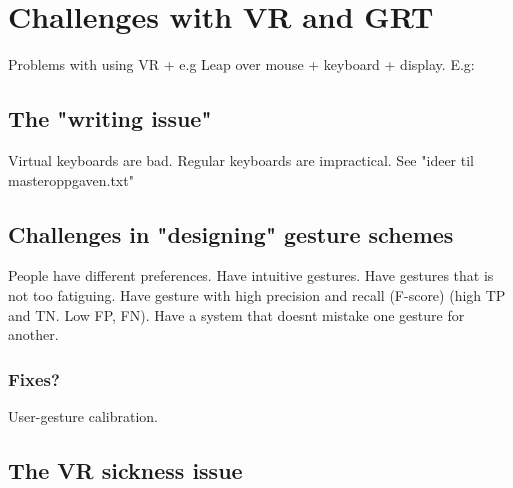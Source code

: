 \section{Challenges with VR and GRT} 
Problems with using VR + e.g Leap over mouse + keyboard + display. E.g:

\subsection{The "writing issue"}
Virtual keyboards are bad. 
Regular keyboards are impractical. 
See "ideer til masteroppgaven.txt"

\subsection{Challenges in "designing" gesture schemes}
People have different preferences. Have intuitive gestures. Have gestures that is not too
fatiguing. Have gesture with high precision and recall (F-score) (high TP and TN. Low FP, FN).
Have a system that doesnt mistake one gesture for another.

\subsubsection{Fixes?}
User-gesture calibration. 

\subsection{The VR sickness issue}